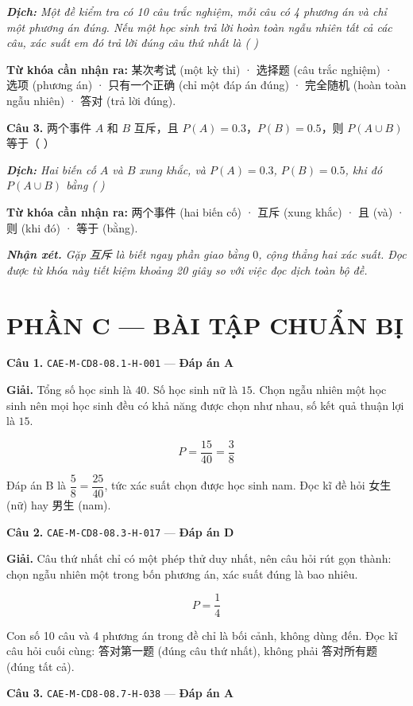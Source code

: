 \documentclass[11pt, a4paper]{article}
\begin{document}
\noindent\emph{\textbf{Dịch:} Một đề kiểm tra có 10 câu trắc nghiệm, mỗi câu có 4 phương án và chỉ một phương án đúng. Nếu một học sinh trả lời hoàn toàn ngẫu nhiên tất cả các câu, xác suất em đó trả lời đúng câu thứ nhất là ( )}

\textbf{Từ khóa cần nhận ra:} 某次考试 (một kỳ thi) · 选择题 (câu trắc nghiệm) · 选项 (phương án) · 只有一个正确 (chỉ một đáp án đúng) · 完全随机 (hoàn toàn ngẫu nhiên) · 答对 (trả lời đúng).

\textbf{Câu 3.} 两个事件 $A$ 和 $B$ 互斥，且 $P(A)=0.3$，$P(B)=0.5$，则 $P(A\cup B)$ 等于（ ）

\noindent\emph{\textbf{Dịch:} Hai biến cố $A$ và $B$ xung khắc, và $P(A) = 0.3$, $P(B) = 0.5$, khi đó $P(A \cup B)$ bằng ( )}

\textbf{Từ khóa cần nhận ra:} 两个事件 (hai biến cố) · 互斥 (xung khắc) · 且 (và) · 则 (khi đó) · 等于 (bằng).

\noindent\emph{\textbf{Nhận xét.} Gặp 互斥 là biết ngay phần giao bằng $0$, cộng thẳng hai xác suất. Đọc được từ khóa này tiết kiệm khoảng 20 giây so với việc đọc dịch toàn bộ đề.}

\section{PHẦN C — BÀI TẬP CHUẨN BỊ}

\textbf{Câu 1.} \texttt{CAE-M-CD8-08.1-H-001} — \textbf{Đáp án A}

\textbf{Giải.} Tổng số học sinh là $40$. Số học sinh nữ là $15$. Chọn ngẫu nhiên một học sinh nên mọi học sinh đều có khả năng được chọn như nhau, số kết quả thuận lợi là $15$.

$$P = \frac{15}{40} = \frac{3}{8}$$

 Đáp án B là $\dfrac{5}{8} = \dfrac{25}{40}$, tức xác suất chọn được học sinh nam. Đọc kĩ đề hỏi 女生 (nữ) hay 男生 (nam).

\textbf{Câu 2.} \texttt{CAE-M-CD8-08.3-H-017} — \textbf{Đáp án D}

\textbf{Giải.} Câu thứ nhất chỉ có một phép thử duy nhất, nên câu hỏi rút gọn thành: chọn ngẫu nhiên một trong bốn phương án, xác suất đúng là bao nhiêu.

$$P = \frac{1}{4}$$

 Con số 10 câu và 4 phương án trong đề chỉ là bối cảnh, không dùng đến. Đọc kĩ câu hỏi cuối cùng: 答对第一题 (đúng câu thứ nhất), không phải 答对所有题 (đúng tất cả).

\textbf{Câu 3.} \texttt{CAE-M-CD8-08.7-H-038} — \textbf{Đáp án A}
\end{document}

